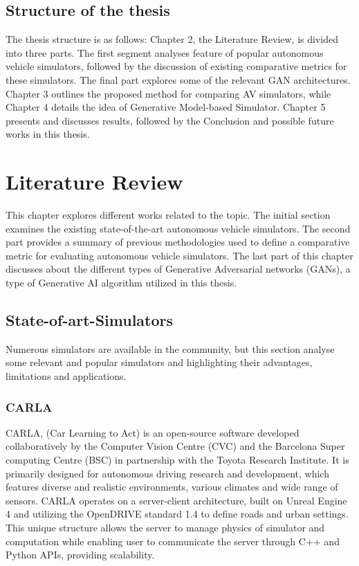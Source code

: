 \documentclass[12pt,twoside,a4paper,parskip]{scrbook} %
\begin{document}
\section{Structure of the thesis}
The thesis structure is as follows: Chapter 2, the Literature Review, is divided into three parts. The first segment analyses feature of popular autonomous vehicle simulators, followed by the discussion of existing comparative metrics for these simulators. The final part explores some of the relevant GAN architectures. Chapter 3 outlines the proposed method for comparing AV simulators, while Chapter 4 details the idea of Generative Model-based Simulator. Chapter 5 presents and discusses results, followed by the Conclusion and possible future works in this thesis.

\chapter{Literature Review}
This chapter explores different works related to the topic. The initial section examines the existing state-of-the-art autonomous vehicle simulators. The second part provides a summary of previous methodologies used to define a comparative metric for evaluating autonomous vehicle simulators. The last part of this chapter discusses about the different types of Generative Adversarial networks (GANs), a type of Generative AI algorithm utilized in this thesis. 
\section{State-of-art-Simulators}
Numerous simulators are available in the community, but this section analyse some relevant and popular simulators and highlighting their advantages, limitations and applications.
\subsection{CARLA}
CARLA, (Car Learning to Act) is an open-source software developed collaboratively by the Computer Vision Centre (CVC) and the Barcelona Super computing Centre (BSC) in partnership with the Toyota Research Institute. It is primarily designed for autonomous driving research and development, which features diverse and realistic environments, various climates and wide range of sensors. CARLA operates on a server-client architecture, built on Unreal Engine 4 and utilizing the OpenDRIVE standard 1.4 to define roads and urban settings. This unique structure allows the server to manage physics of simulator and computation while enabling user to communicate the server through C++ and Python APIs, providing scalability.
\end{document}
